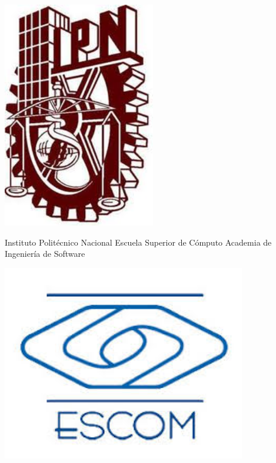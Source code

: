 \thispagestyle{empty}

\begin{minipage}{0.20\textwidth}
	\includegraphics[width=0.5\textwidth]{cover/ipn.jpg}
\end{minipage}
\begin{minipage}{0.60\textwidth}
\begin{center}
\LARGE Instituto Politécnico Nacional \newline
\LARGE Escuela Superior de Cómputo \newline
\LARGE Academia de Ingeniería de Software \newline
\end{center}
\end{minipage}
\begin{minipage}{0.20\textwidth}
\includegraphics[width=0.8\textwidth]{cover/escom.jpg}

\end{minipage}%

